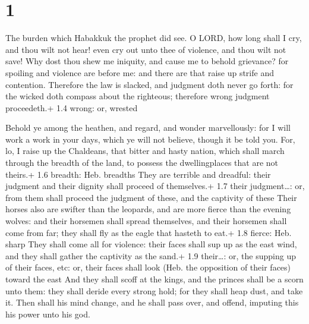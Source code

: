 \hypertarget{section}{%
\section{1}\label{section}}

 The burden which Habakkuk the prophet did see. 
O LORD, how long shall I cry, and thou wilt not hear! even cry out unto
thee of violence, and thou wilt not save!  Why dost thou
shew me iniquity, and cause me to behold grievance? for spoiling and
violence are before me: and there are that raise up strife and
contention.  Therefore the law is slacked, and judgment doth
never go forth: for the wicked doth compass about the righteous;
therefore wrong judgment proceedeth.+ 1.4 wrong: or, wrested

 Behold ye among the heathen, and regard, and wonder
marvellously: for I will work a work in your days, which ye will not
believe, though it be told you.  For, lo, I raise up the
Chaldeans, that bitter and hasty nation, which shall march through the
breadth of the land, to possess the dwellingplaces that are not theirs.+
1.6 breadth: Heb. breadths  They are terrible and dreadful:
their judgment and their dignity shall proceed of themselves.+ 1.7 their
judgment\ldots: or, from them shall proceed the judgment of these, and
the captivity of these  Their horses also are swifter than
the leopards, and are more fierce than the evening wolves: and their
horsemen shall spread themselves, and their horsemen shall come from
far; they shall fly as the eagle that hasteth to eat.+ 1.8 fierce: Heb.
sharp  They shall come all for violence: their faces shall
sup up as the east wind, and they shall gather the captivity as the
sand.+ 1.9 their\ldots: or, the supping up of their faces, etc: or,
their faces shall look (Heb. the opposition of their faces) toward the
east  And they shall scoff at the kings, and the princes
shall be a scorn unto them: they shall deride every strong hold; for
they shall heap dust, and take it.  Then shall his mind
change, and he shall pass over, and offend, imputing this his power unto
his god.

